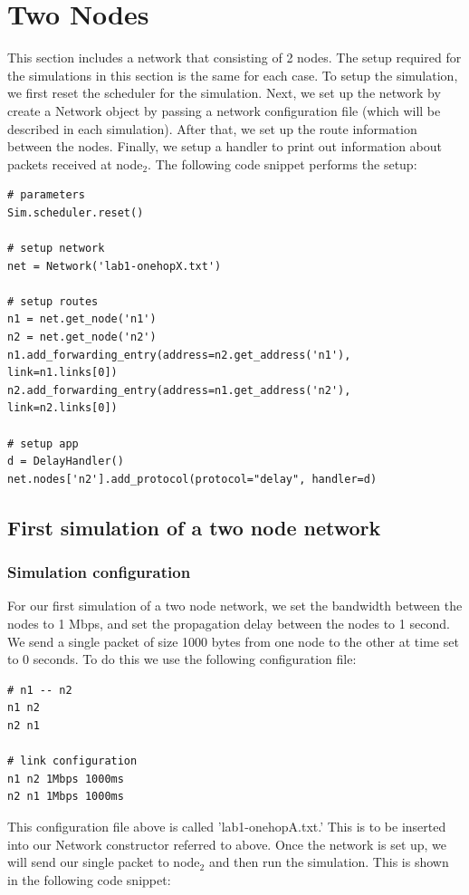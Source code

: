 \documentclass[fleqn,11pt]{article}
\begin{document}
\section{Two Nodes}
This section includes a network that consisting of 2 nodes. The setup required for the simulations in this section is the same for each case. To setup the simulation, we first reset the scheduler for the simulation. Next, we set up the network by create a Network object by passing a network configuration file (which will be described in each simulation). After that, we set up the route information between the nodes. Finally, we setup a handler to print out information about packets received at node$_2$. The following code snippet performs the setup:
\begin{lstlisting}
# parameters
Sim.scheduler.reset()

# setup network
net = Network('lab1-onehopX.txt')

# setup routes
n1 = net.get_node('n1')
n2 = net.get_node('n2')
n1.add_forwarding_entry(address=n2.get_address('n1'), link=n1.links[0])
n2.add_forwarding_entry(address=n1.get_address('n2'), link=n2.links[0])

# setup app
d = DelayHandler()
net.nodes['n2'].add_protocol(protocol="delay", handler=d)
\end{lstlisting}

 \subsection{First simulation of a two node network}
\subsubsection{Simulation configuration}
For our first simulation of a two node network, we set the bandwidth between the nodes to 1 Mbps, and set the propagation delay between the nodes to 1 second. We send a single packet of size 1000 bytes from one node to the other at time set to 0 seconds. To do this we use the following configuration file:

\begin{lstlisting}
# n1 -- n2
n1 n2
n2 n1

# link configuration
n1 n2 1Mbps 1000ms
n2 n1 1Mbps 1000ms
\end{lstlisting}

This configuration file above is called 'lab1-onehopA.txt.' This is to be inserted into our Network constructor referred to above.
Once the network is set up, we will send our single packet to node$_2$ and then run the simulation. This is shown in the following code snippet:    
\end{document}

